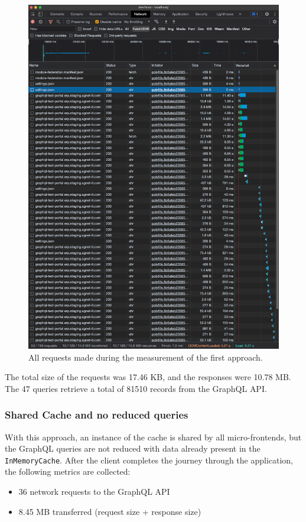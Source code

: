 \ifshowImages
\begin{figure}[H]
\centering
\includegraphics[width=0.7\linewidth]{images/results/1-attempt/no-shared-cache-no-reduction.png}
\caption{All requests made during the measurement of the first approach.}\label{fig:results:no-shared-cache-no-reduction}
\end{figure}
\fi

\noindent The total size of the requests was 17.46 KB, and the responses were 10.78 MB. The 47 queries retrieve a total of 81510 records from the GraphQL  \ac{API}.

\subsubsection{Shared Cache and no reduced queries}\label{subsubsection:results:performance-measurement:shared-cache-no-reduction}

With this approach, an instance of the cache is shared by all micro-frontends, but the GraphQL queries are not reduced with data already present in the \texttt{InMemoryCache}. After the client completes the journey through the application, the following metrics are collected:

\begin{itemize}
  \item 36 network requests to the GraphQL \ac{API}
  \item 8.45 MB transferred (request size + response size)
\end{itemize}

